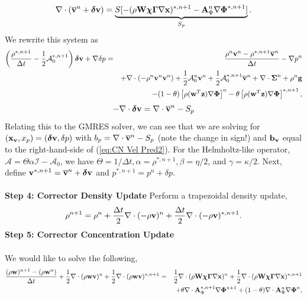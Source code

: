 \documentclass[final]{siamltex}
\def\Ab {{\bf A}}
\def\bb {{\bf b}}
\def\gb {{\bf g}}
\def\vb {{\bf v}}
\def\wb {{\bf w}}
\def\Wb {{\bf W}}
\def\xb {{\bf x}}
\def\zb {{\bf z}}
\def\chib   {\boldsymbol{\chi}}
\def\deltab {\boldsymbol{\delta}}
\def\Gammab {\boldsymbol{\Gamma}}
\def\Phib   {\boldsymbol{\Phi}}
\def\Sigmab {\boldsymbol{\Sigma}}
\def\half   {\frac{1}{2}}
\begin{document}
\begin{equation}
\nabla\cdot(\overline\vb^n+\deltab\vb) = \underbrace{S[-(\rho\Wb\chib\Gammab\nabla\xb)^{*,n+1} - \Ab_\Phi^n\nabla\Phib^{*,n+1}]}_{S_p}.
\end{equation}
We rewrite this system as
\begin{eqnarray}
\left(\frac{\rho^{*,n+1}}{\Delta t} - \half\mathcal{A}_0^{*,n+1}\right)\deltab\vb + \nabla\delta p &=& \frac{\rho^n\vb^n-\rho^{*,n+1}\overline\vb^n}{\Delta t} -\nabla p^n\nonumber\\
&&+ \nabla\cdot(-\rho^n\vb^n\vb^n) + \half\mathcal{A}_0^n\vb^n + \half\mathcal{A}_0^{*,n+1}\overline\vb^n + \nabla\cdot\Sigmab^n + \rho^n\gb\nonumber\\
&&- (1-\theta)\left[\rho(\wb^T\zb)\nabla\Phib\right]^n - \theta\left[\rho(\wb^T\zb)\nabla\Phib\right]^{*,n+1},\label{eq:CN Vel Pred2}
\end{eqnarray}
\begin{equation}
-\nabla\cdot\deltab\vb = \nabla\cdot\overline\vb^n - S_p
\end{equation}
Relating this to the GMRES solver, we can see that we are solving for 
$(\xb_\vb,x_p) = (\deltab\vb,\delta p)$ with $b_p = \nabla\cdot\overline\vb^n-S_p$ (note the change in sign!) 
and $\bb_\vb$ equal to the right-hand-side of (\ref{eq:CN Vel Pred2}).  For the Helmholtz-like operator, 
$\mathcal{A}=\Theta\alpha\mathcal{I} - \mathcal{A}_0$, we have $\Theta=1/\Delta t, \alpha=\rho^{*,n+1}, 
\beta=\eta/2$, and $\gamma=\kappa/2$.
Next, define $\vb^{*,n+1} = \overline\vb^n + \deltab\vb$ and $p^{*,n+1} = p^n + \delta p$.\\ \\
{\bf Step 4: Corrector Density Update}
Perform a trapezoidal density update,
\begin{equation}
\rho^{n+1} = \rho^n + \frac{\Delta t}{2} \nabla\cdot(-\rho\vb)^n + \frac{\Delta t}{2} \nabla\cdot(-\rho\vb)^{*,n+1}.
\end{equation}
{\bf Step 5: Corrector Concentration Update}\\ \\
We would like to solve the following,
\begin{eqnarray}
\frac{(\rho\wb)^{n+1} - (\rho\wb^n)}{\Delta t} + \half\nabla\cdot(\rho\wb\vb)^n + \half\nabla\cdot(\rho\wb\vb)^{*,n+1} &=&\half\nabla\cdot(\rho\Wb\chib\Gammab\nabla\xb)^n + \half\nabla\cdot(\rho\Wb\chib\Gammab\nabla\xb)^{*,n+1} \nonumber\\
&&\hspace{-2in} + \theta\nabla\cdot \Ab_\Phi^{*,n+1}\nabla\Phib^{n+1} +
(1-\theta)\nabla\cdot \Ab_\Phi^n\nabla\Phib^n,\label{eq:implicit phi3}
\end{eqnarray}
\end{document}
